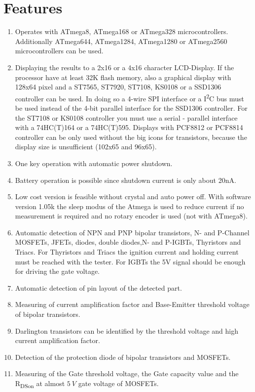 \chapter{Features}
\label{sec:features}
\begin{enumerate}
\item Operates with ATmega8, ATmega168 or ATmega328 microcontrollers. Additionally ATmega644, ATmega1284,
ATmega1280 or ATmega2560 microcontrollers can be used.
\item Displaying the results to a 2x16 or a 4x16 character LCD-Display.
 If the processor have at least 32K flash memory, also a graphical display with 128x64 pixel and
a ST7565, ST7920, ST7108, KS0108 or a SSD1306 controller can be used.
In doing so a 4-wire SPI interface or a I\textsuperscript{2}C bus must be used instead of the 4-bit parallel interface for
the SSD1306 controller. For the ST7108 or KS0108 controller you must use a serial - parallel interface with a 74HC(T)164
or a 74HC(T)595.
Displays with PCF8812 or PCF8814 controller can be only used without the big icons for transistors, because the display size is
unsufficient (102x65 and 96x65).
\item One key operation with automatic power shutdown.
\item Battery operation is possible since shutdown current is only about 20nA.
\item Low cost version is feasible without crystal and auto power off.
With software version 1.05k the sleep modus of the Atmega is used to reduce current if
no measurement is required and no rotary encoder is used (not with ATmega8).
\item Automatic detection of NPN and PNP bipolar transistors, N- and P-Channel MOSFETs, JFETs,
diodes, double diodes,N- and P-IGBTs, Thyristors and Triacs.
For Thyristors and Triacs the ignition current and holding current must be reached with the tester.
For IGBTs the 5V signal should be enough for driving the gate voltage.
\item Automatic detection of pin layout of the detected part.
\item Measuring of current amplification factor and Base-Emitter threshold voltage of bipolar transistors.
\item Darlington transistors can be identified by the threshold voltage and high current amplification factor.
\item Detection of the protection diode of bipolar transistors and MOSFETs.
\item Measuring of the Gate threshold voltage, the Gate capacity value and the R\textsubscript{DSon} at almost \(5~V\) gate voltage of MOSFETs.

\end{enumerate}

